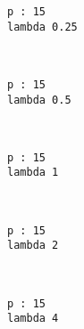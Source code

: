 \documentclass[11pt]{article}
\begin{document}
    \begin{Verbatim}[commandchars=\\\{\}]
p : 15
lambda 0.25

    \end{Verbatim}

    \begin{center}
    \end{center}
    { \hspace*{\fill} \\}
    
    \begin{Verbatim}[commandchars=\\\{\}]
p : 15
lambda 0.5

    \end{Verbatim}

    \begin{center}
    \end{center}
    { \hspace*{\fill} \\}
    
    \begin{Verbatim}[commandchars=\\\{\}]
p : 15
lambda 1

    \end{Verbatim}

    \begin{center}
    \end{center}
    { \hspace*{\fill} \\}
    
    \begin{Verbatim}[commandchars=\\\{\}]
p : 15
lambda 2

    \end{Verbatim}

    \begin{center}
    \end{center}
    { \hspace*{\fill} \\}
    
    \begin{Verbatim}[commandchars=\\\{\}]
p : 15
lambda 4

    \end{Verbatim}
\end{document}
